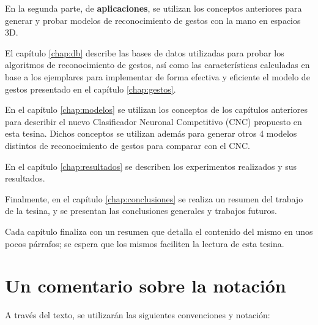 En la segunda parte, de \textbf{aplicaciones}, se utilizan los conceptos anteriores para generar y probar modelos de reconocimiento de gestos con la mano en espacios 3D.

El capítulo \ref{chap:db} describe las bases de datos utilizadas para probar los algoritmos de reconocimiento de gestos, así como las características calculadas en base a los ejemplares para implementar de forma efectiva y eficiente el modelo de gestos presentado en el capítulo \ref{chap:gestos}. 

En el capítulo \ref{chap:modelos} se utilizan los conceptos de los capítulos anteriores para describir el nuevo Clasificador Neuronal Competitivo (CNC) propuesto en esta tesina. Dichos conceptos se utilizan además para generar otros 4 modelos distintos de reconocimiento de gestos para comparar con el CNC.

En el capítulo \ref{chap:resultados} se describen los experimentos realizados y sus resultados.

Finalmente, en el capítulo \ref{chap:conclusiones} se realiza un resumen del trabajo de la tesina, y se presentan las conclusiones generales y trabajos futuros.

Cada capítulo finaliza con un resumen que detalla el contenido del mismo en unos pocos párrafos; se espera que los mismos faciliten la lectura de esta tesina.


\section*{Un comentario sobre la notación}

A través del texto, se utilizarán las siguientes convenciones y notación:

